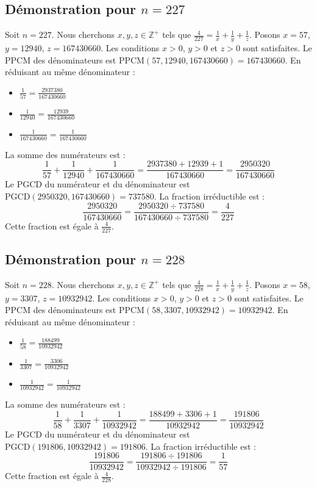 \documentclass[11pt,a4paper]{article}
\begin{document}
\subsection{Démonstration pour $n = 227$}
Soit $n = 227$. Nous cherchons $x, y, z \in \mathbb{Z}^{+}$ tels que $\frac{4}{227} = \frac{1}{x} + \frac{1}{y} + \frac{1}{z}$.
Posons $x = 57$, $y = 12940$, $z = 167430660$.
Les conditions $x > 0$, $y > 0$ et $z > 0$ sont satisfaites.
Le PPCM des dénominateurs est $\text{PPCM}(57, 12940, 167430660) = 167430660$.
En réduisant au même dénominateur :
\begin{itemize}
    \item $\frac{1}{57} = \frac{2937380}{167430660}$
    \item $\frac{1}{12940} = \frac{12939}{167430660}$
    \item $\frac{1}{167430660} = \frac{1}{167430660}$
\end{itemize}
La somme des numérateurs est :
$$ \frac{1}{57} + \frac{1}{12940} + \frac{1}{167430660} = \frac{2937380 + 12939 + 1}{167430660} = \frac{2950320}{167430660} $$
Le PGCD du numérateur et du dénominateur est $\text{PGCD}(2950320, 167430660) = 737580$.
La fraction irréductible est :
$$ \frac{2950320}{167430660} = \frac{2950320 \div 737580}{167430660 \div 737580} = \frac{4}{227} $$
Cette fraction est égale à $\frac{4}{227}$.

\subsection{Démonstration pour $n = 228$}
Soit $n = 228$. Nous cherchons $x, y, z \in \mathbb{Z}^{+}$ tels que $\frac{4}{228} = \frac{1}{x} + \frac{1}{y} + \frac{1}{z}$.
Posons $x = 58$, $y = 3307$, $z = 10932942$.
Les conditions $x > 0$, $y > 0$ et $z > 0$ sont satisfaites.
Le PPCM des dénominateurs est $\text{PPCM}(58, 3307, 10932942) = 10932942$.
En réduisant au même dénominateur :
\begin{itemize}
    \item $\frac{1}{58} = \frac{188499}{10932942}$
    \item $\frac{1}{3307} = \frac{3306}{10932942}$
    \item $\frac{1}{10932942} = \frac{1}{10932942}$
\end{itemize}
La somme des numérateurs est :
$$ \frac{1}{58} + \frac{1}{3307} + \frac{1}{10932942} = \frac{188499 + 3306 + 1}{10932942} = \frac{191806}{10932942} $$
Le PGCD du numérateur et du dénominateur est $\text{PGCD}(191806, 10932942) = 191806$.
La fraction irréductible est :
$$ \frac{191806}{10932942} = \frac{191806 \div 191806}{10932942 \div 191806} = \frac{1}{57} $$
Cette fraction est égale à $\frac{4}{228}$.
\end{document}
